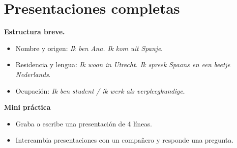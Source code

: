 \section{Presentaciones completas}
\textbf{Estructura breve.}
\begin{itemize}[leftmargin=*]
  \item Nombre y origen: \textit{Ik ben Ana. Ik kom uit Spanje}.
  \item Residencia y lengua: \textit{Ik woon in Utrecht. Ik spreek Spaans en een beetje Nederlands}.
  \item Ocupación: \textit{Ik ben student / ik werk als verpleegkundige}.
\end{itemize}

\textbf{Mini práctica}
\begin{itemize}[leftmargin=*]
  \item Graba o escribe una presentación de 4 líneas.
  \item Intercambia presentaciones con un compañero y responde una pregunta.
\end{itemize}
